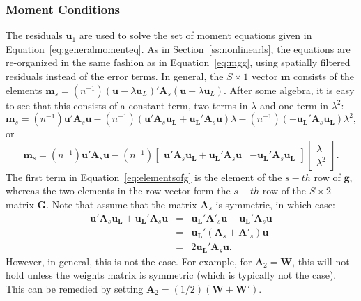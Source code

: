\documentclass{article}
\begin{document}
 \subsubsection{Moment Conditions}
 The residuals $\mathbf{u}_1$ are used to solve the set of moment equations given
 in Equation~\ref{eq:generalmomenteq}. As in Section~\ref{ss:nonlinearls}, the 
 equations are re-organized in the same fashion as in Equation~\ref{eq:mgg},
 using spatially filtered residuals instead of the error terms. 
 In general, the $S \times 1$ vector $\mathbf{m}$ consists of the elements
 $\mathbf{m}_s = (n^{-1}) (\mathbf{u} - \lambda \mathbf{u}_L) ' \mathbf{A}_s (\mathbf{u} - \lambda \mathbf{u}_L)$. After some algebra, it is easy to see that this consists of a constant term, two terms
 in $\lambda$ and one term in $\lambda^2$:
 \begin{equation*}
\mathbf{m}_s =  (n^{-1}) \mathbf{u'} \mathbf{A}_s \mathbf{u} - (n^{-1}) (\mathbf{u'} \mathbf{A}_s \mathbf{u_L} 
 +  \mathbf{u_L'} \mathbf{A}_s \mathbf{u} ) \lambda
 -  (n^{-1}) (- \mathbf{u_L'} \mathbf{A}_s \mathbf{u_L} ) \lambda^2,
 \end{equation*}
 or
 \begin{equation}\label{eq:elementsofg}
\mathbf{m}_s = (n^{-1}) \mathbf{u'} \mathbf{A}_s \mathbf{u}
- (n^{-1}) \left[ 
\begin{matrix}
\mathbf{u'} \mathbf{A}_s \mathbf{u_L} 
 +  \mathbf{u_L'} \mathbf{A}_s \mathbf{u}  & - \mathbf{u_L'} \mathbf{A}_s \mathbf{u_L} 
 \end{matrix}
  \right]
\left[
\begin{matrix}
\lambda\\
\lambda^2
\end{matrix}
\right].
\end{equation}
The first term in Equation~\ref{eq:elementsofg} is the element of the $s-th$ row of $\mathbf{g}$, whereas
the two elements in the row vector form the $s-th$ row of the $S \times 2$ matrix $\mathbf{G}$. 
Note that \citet[p. 7]{Drukkeretal:10} assume that the matrix $\mathbf{A}_s$ is symmetric,
in which case:
\begin{eqnarray}
\mathbf{u'} \mathbf{A}_s \mathbf{u_L} 
 +  \mathbf{u_L'} \mathbf{A}_s \mathbf{u} &=& \mathbf{u_L'} \mathbf{A'}_s \mathbf{u} 
 +  \mathbf{u_L'} \mathbf{A}_s \mathbf{u}\\
 &=& \mathbf{u_L'} ( \mathbf{A}_s + \mathbf{A'}_s )  \mathbf{u}\\
 &=& 2  \mathbf{u_L'}  \mathbf{A}_s  \mathbf{u}. \label{eq:uulAu}
\end{eqnarray}
However, in general, this is not the case. For example, for $\mathbf{A}_2 = \mathbf{W}$,
this will not hold unless the weights matrix is symmetric (which is typically not the case).
This can be remedied by setting $\mathbf{A}_2 = (1/2)( \mathbf{W} + \mathbf{W'} )$.
\end{document}
